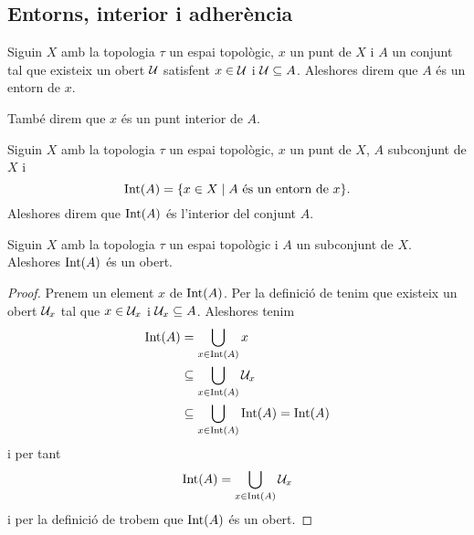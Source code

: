 \documentclass[../Apunts.tex]{subfiles}
\begin{document}
	\subsection{Entorns, interior i adherència}
	\begin{definition}[Entorn]
		\label{def:entorn}
		\label{def:punt interior}
		Siguin \(X\) amb la topologia \(\tau\) un espai topològic, \(x\) un punt de \(X\) i \(A\) un conjunt tal que existeix un obert \(\mathcal{U}\) satisfent \(x\in\mathcal{U}\) i \(\mathcal{U}\subseteq A\). Aleshores direm que \(A\) és un entorn de \(x\).
		
		També direm que \(x\) és un punt interior de \(A\).
	\end{definition}
	\begin{definition}[Interior]
		\label{def:interior}
		Siguin \(X\) amb la topologia \(\tau\) un espai topològic, \(x\) un punt de \(X\), \(A\) subconjunt de \(X\) i
		\[\operatorname{Int}(A)=\{x\in X\mid A\text{ és un entorn de }x\}.\]
		Aleshores direm que \(\operatorname{Int}(A)\) és l'interior del conjunt \(A\).
	\end{definition}
	\begin{proposition}
		Siguin \(X\) amb la topologia \(\tau\) un espai topològic i \(A\) un subconjunt de \(X\). Aleshores \(\operatorname{Int}(A)\) és un obert.
		\begin{proof}
			Prenem un element \(x\) de \(\operatorname{Int}(A)\). Per la definició de  tenim que existeix un obert \(\mathcal{U}_{x}\) tal que \(x\in\mathcal{U}_{x}\) i \(\mathcal{U}_{x}\subseteq A\). Aleshores tenim
			\begin{align*}
			\operatorname{Int}(A)&=\bigcup_{x\in\operatorname{Int}(A)}x \\
			&\subseteq\bigcup_{x\in\operatorname{Int}(A)}\mathcal{U}_{x} \\
			&\subseteq\bigcup_{x\in\operatorname{Int}(A)}\operatorname{Int}(A)=\operatorname{Int}(A)
			\end{align*}
			i per tant
			\[\operatorname{Int}(A)=\bigcup_{x\in\operatorname{Int}(A)}\mathcal{U}_{x}\]
			i per la definició de  trobem que \(\operatorname{Int}(A)\) és un obert.
		\end{proof}
	\end{proposition}
	\begin{definition}[Adherència]
		\label{def:adherència}
	\end{definition}
\end{document}

